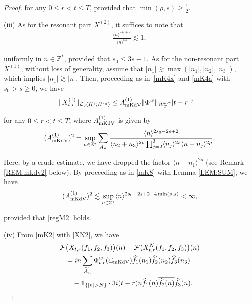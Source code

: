 \documentclass[letterpaper, 11pt,  reqno]{amsart}
\newcommand{\1}{\hspace{0.5mm}\text{I}\hspace{0.5mm}}
\newcommand{\noi}{\noindent}
\newcommand{\Z}{\mathbb{Z}}
\newcommand{\F}{\mathcal{F}}
\newcommand{\g}{\gamma}
\newcommand{\ft}{\widehat}
\newcommand{\wt}{\widetilde}
\newcommand{\cj}{\overline}
\newcommand{\les}{\lesssim}
\newcommand{\ges}{\gtrsim}
\newcommand{\jb}[1]
{\langle #1 \rangle}
\newcommand{\ind}{\mathbf 1}
\newcommand{\cL}{\mathcal{L}}
\newcommand{\W}{\mathcal{W}}
\newcommand{\MKDV}{\text{\rm mKdV} }
\numberwithin{equation}{section}
\numberwithin{theorem}{section}
\begin{document}
\begin{proof}
\noi
for any $0 \le r <  t \le T$, 
provided that 
$\min(\rho, s) \ge  \frac 12$.





\medskip

\noi
(iii) 
As for   the resonant part $X^{(2)}$, it suffices
to note that 
\begin{align*}
\frac{\jb{n}^{2s_0+2}}{\jb{n}^{6s}}
\les 1, 
\end{align*}

\noi
\noi
uniformly in $n \in \Z^*$, 
provided that 
 $s_0 \le 3s - 1$.
As for the non-resonant part $X^{(1)}$, 
without loss of generality,
assume that $|n_1| \ges \max (|n_1|, |n_2|,  |n_3|)$, 
which implies $|n_1|\ges |n|$.
Then, 
proceeding as in~\eqref{mK4x} and \eqref{mK4a}
with $s_0 > s\ge 0$, 
we have 
\begin{align*}
\|X_{t,r}^{(1)}\|_{\cL_3(H^s; H^{s_0})}
&\leq A_\MKDV^{(1)} \| \Phi^w \|_{\W_T^{\rho,\g}}|t-r|^{\g}
\end{align*}



\noi
for any $0 \le r <  t \le T$, 
where $ A_\MKDV^{(1)}$ is given by 
\begin{align*}
( A_\MKDV^{(1)})^2
 =
 \sup_{n\in \Z^*} 
\sum_{A_n}
\frac{\jb{n}^{2s_0 - 2s +2} }{\jb{n_2 + n_3}^{2\rho} \prod_{j = 2}^3\jb{n_j}^{2s} \jb{n - n_j}^{2\rho}}.
\end{align*}

\noi
Here, by a crude estimate, 
we have dropped 
the factor $\jb{n - n_1}^{2\rho}$ (see Remark \ref{REM:mkdv2} below).
By proceeding as in \eqref{mK8} with 
Lemma \ref{LEM:SUM}, 
we have 
\begin{align*}
( A_\MKDV^{(1)})^2 \les 
\sup_{n\in \Z^*} 
\jb{n}^{2 s_0 -2s + 2 - 4\min(\rho, s)} < \infty, 
\end{align*}

\noi
provided that \eqref{regM2} holds.





\medskip

\noi
(iv) 
From \eqref{mK2} with \eqref{XN2}, we have 
\begin{align*}
 \F & \big(X_{t,r} (f_1,f_2, f_3) \big)(n)
- \F\big(X^N_{t,r} (f_1,f_2, f_3) \big)(n)\\
& = in  \sum_{ \wt A_n }
 \Phi^w_{t,r}(\Xi_\MKDV )
\ft f_1(n_1)  \ft f_2(n_2) \ft f_3(n_3)\\
& \quad - \ind_{\{|n| > N\}}\cdot 3 i (t-r)n \ft f_1(n)\cj{\ft f_2(n)}\ft f_3(n).
\end{align*}



\end{proof}
\end{document}
